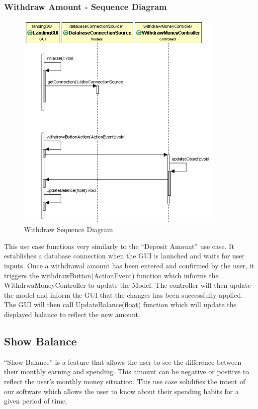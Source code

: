 \documentclass[12pt]{article}
\begin{document}
\subsubsection{Withdraw Amount - Sequence Diagram}
\begin{figure}[h!]
  \centering
  \includegraphics[width=100mm]{withdraw_sequence.png}
  \caption{Withdraw Sequence Diagram}
\end{figure}
\clearpage

This use case functions very similarly to the “Deposit Amount” use case. It establishes a database connection when the GUI is launched and waits for user inputs. Once a withdrawal amount has been entered and confirmed by the user, it triggers the withdrawButton(ActionEvent) function which informs the WithdrwaMoneyController to update the Model. The controller will then update the model and inform the GUI that the changes has been successfully applied. The GUI will then call UpdateBalance(float) function which will update the displayed balance to reflect the new amount.

\subsection{Show Balance} 
“Show Balance” is a feature that allows the user to see the difference between their monthly earning and spending. This amount can be negative or positive to reflect the user’s monthly money situation. This use case solidifies the intent of our software which allows the user to know about their spending habits for a given period of time.
\end{document}
